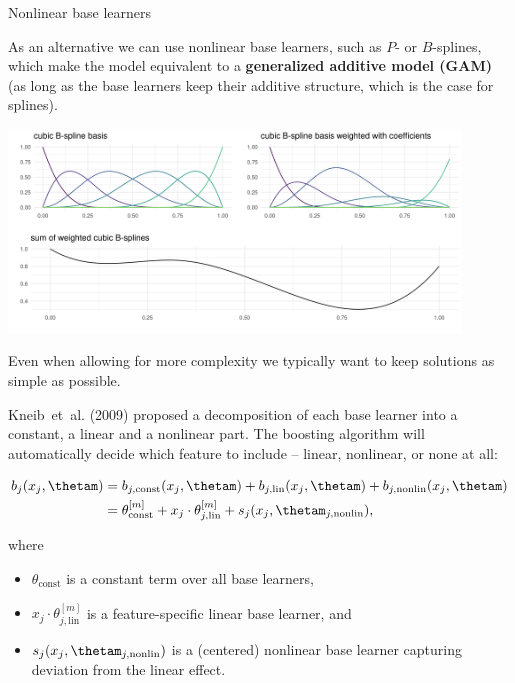\begin{vbframe}{Nonlinear base learners}

As an alternative we can use nonlinear base learners, such as $P$- or 
$B$-splines, which make the model equivalent to a
\textbf{generalized additive model (GAM)} (as long as the base learners keep 
their additive structure, which is the case for splines).
\vspace{0.5cm}

\vfill

\begin{center}
\includegraphics[width=0.9\textwidth]{figure/bspline-basis.png}
\end{center}

% 

\framebreak


Even when allowing for more complexity we typically want to keep solutions as 
simple as possible.

\lz

Kneib~et~al. (2009) proposed a decomposition of each base learner into a 
constant, a linear and a nonlinear part. 
The boosting algorithm will automatically decide which feature to include -- 
linear, nonlinear, or none at all:

\vspace{-0.5cm}

\begin{align*}
b_j(x_j, \thetam) & = b_{j, \text{const}}(x_j, \thetam) + b_{j, \text{lin}}
(x_j, \thetam) + b_{j, \text{nonlin}}(x_j, \thetam)\\
 & = \theta^{[m]}_\text{const} + x_j \cdot \theta^{[m]}_{j, \text{lin}} + 
 s_j(x_j, \thetam_{j,\text{nonlin}}),
\end{align*}

\small
where
\begin{itemize}
  \small
  \item $\theta_\text{const}$ is a constant term over all base learners,
  \item $x_j \cdot \theta^{[m]}_{j, \text{lin}}$ is a feature-specific linear 
  base learner, and
  \item $s_j(x_j, \thetam_{j,\text{nonlin}})$ is a (centered) nonlinear base 
  learner capturing deviation from the linear effect.
\end{itemize}

\end{vbframe}

